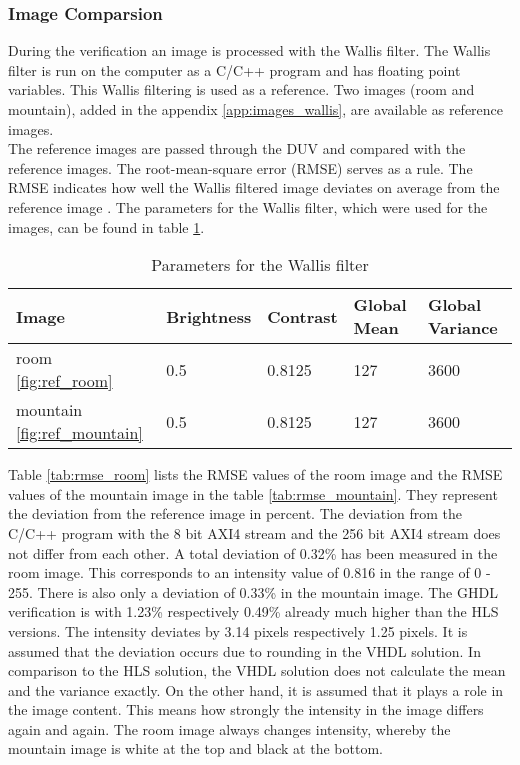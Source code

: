 \subsubsection*{Image Comparsion}
During the verification an image is processed with the Wallis filter. The Wallis filter is run on the computer as a C/C++ program and has floating point variables. This Wallis filtering is used as a reference. Two images (room and mountain), added in the appendix \ref{app:images_wallis}, are available as reference images. \\
The reference images are passed through the DUV and compared with the reference images. The root-mean-square error (RMSE) serves as a rule. The RMSE indicates how well the  Wallis filtered image deviates on average from the reference image \cite{rmse}. The parameters for the Wallis filter, which were used for the images, can be found in table \ref{tab:parameter}.

\begin{table}[tb!]
    \centering
    \begin{tabular}{l l l l l}
        \toprule
        Image & Brightness & Contrast & Global Mean & Global Variance \\
        \midrule
        room \ref{fig:ref_room} & 0.5 & 0.8125 & 127 & 3600 \\
        mountain \ref{fig:ref_mountain} & 0.5 & 0.8125 & 127 & 3600 \\
        \bottomrule
    \end{tabular}
    \caption{Parameters for the Wallis filter}
    \label{tab:parameter}
\end{table}



Table \ref{tab:rmse_room} lists the RMSE values of the room image and the RMSE
values of the mountain image in the table \ref{tab:rmse_mountain}. They
represent the deviation from the reference image in percent. The deviation from
the C/C++ program with the 8 bit AXI4 stream and the 256 bit AXI4 stream does
not differ from each other. A total deviation of 0.32\% has been measured in the
room image. This corresponds to an intensity value of 0.816 in the range of 0 -
255. There is also only a deviation of 0.33\% in the mountain image. The GHDL
verification is with 1.23\% respectively 0.49\% already much higher than the
HLS versions. The intensity deviates by 3.14 pixels respectively 1.25 pixels.
It is assumed that the deviation occurs due to rounding in the VHDL solution. In
comparison to the HLS solution, the VHDL solution does not calculate the mean
and the variance exactly. On the other hand, it is assumed that it plays a role
in the image content. This means how strongly the intensity in the image differs
again and again. The room image always changes intensity, whereby the mountain
image is white at the top and black at the bottom.

